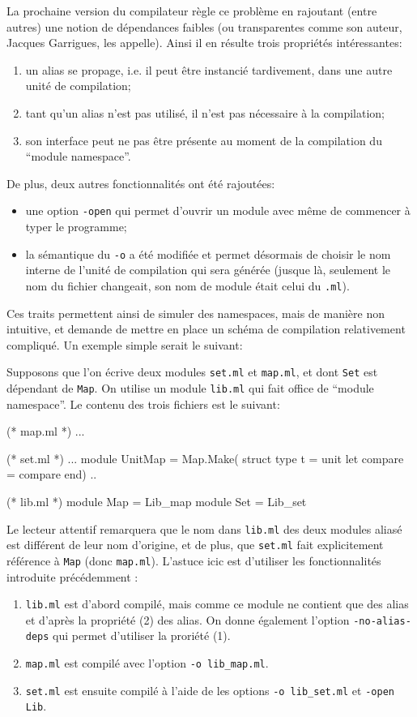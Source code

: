\documentclass[11pt,a4paper]{report}
\begin{document}
La prochaine version du compilateur règle ce problème en rajoutant (entre
autres) une notion de dépendances faibles (ou transparentes comme son auteur,
Jacques Garrigues, les appelle). Ainsi il en résulte trois propriétés
intéressantes:
\begin{enumerate}
\item un alias se propage, i.e. il peut être instancié tardivement, dans une
  autre unité de compilation;
\item tant qu'un alias n'est pas utilisé, il n'est pas nécessaire à la
  compilation; 
\item son interface peut ne pas être présente au moment de la compilation du
  ``module namespace''.
\end{enumerate}
De plus, deux autres fonctionnalités ont été rajoutées:
\begin{itemize}
\item une option \texttt{-open} qui permet d'ouvrir un module avec même de
  commencer à typer le programme;
\item la sémantique du \texttt{-o} a été modifiée et permet désormais de choisir
  le nom interne de l'unité de compilation qui sera générée (jusque là,
  seulement le nom du fichier changeait, son nom de module était celui du
  \texttt{.ml}).
\end{itemize}

Ces traits permettent ainsi de simuler des namespaces, mais de manière non
intuitive, et demande de mettre en place un schéma de compilation relativement
compliqué. Un exemple simple serait le suivant:

Supposons que l'on écrive deux modules \texttt{set.ml} et \texttt{map.ml}, et
dont \texttt{Set} est dépendant de \texttt{Map}. On utilise un module
\texttt{lib.ml} qui fait office de ``module namespace''. Le contenu des trois
fichiers est le suivant:

\begin{OCaml}
(* map.ml *)
...

(* set.ml *)
...
module UnitMap = Map.Make(
  struct 
    type t = unit 
    let compare = compare 
  end)
..

(* lib.ml *)
module Map = Lib_map
module Set = Lib_set
\end{OCaml}

Le lecteur attentif remarquera que le nom dans \texttt{lib.ml} des deux modules
aliasé est différent de leur nom d'origine, et de plus, que \texttt{set.ml} fait
explicitement référence à \texttt{Map} (donc \texttt{map.ml}). L'astuce icic est
d'utiliser les fonctionnalités introduite précédemment :
\begin{enumerate}
\item \texttt{lib.ml} est d'abord compilé, mais comme ce module ne contient que
  des alias et d'après la propriété (2) des alias. On donne également l'option
  \texttt{-no-alias-deps} qui permet d'utiliser la proriété (1).
\item \texttt{map.ml} est compilé avec l'option \texttt{-o lib\_map.ml}.
\item \texttt{set.ml} est ensuite compilé à l'aide de les options \texttt{-o
  lib\_set.ml} et \texttt{-open Lib}.
\end{enumerate}
\end{document}

